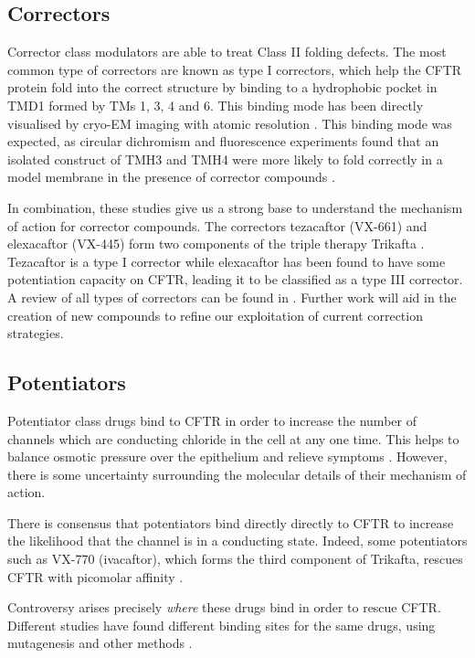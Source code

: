 \subsection{Correctors}
Corrector class modulators are able to treat Class II folding defects. The most common type of correctors are known as type I correctors, which help the CFTR protein fold into the correct structure by binding to a hydrophobic pocket in TMD1 formed by TMs 1, 3, 4 and 6. This binding mode has been directly visualised by cryo-EM imaging with atomic resolution \cite{fiedorczuk2022}. This binding mode was expected, as circular dichromism \cite{greenfield2006} and fluorescence experiments found that an isolated construct of TMH3 and TMH4 were more likely to fold correctly in a model membrane in the presence of corrector compounds \cite{krainer2018}. 

In combination, these studies give us a strong base to understand the mechanism of action for corrector compounds. The correctors tezacaftor (VX-661) and elexacaftor (VX-445) form two components of the triple therapy Trikafta \cite{administration2021, trikafta_website}. Tezacaftor is a type I corrector while elexacaftor has been found to have some potentiation capacity on CFTR, leading it to be classified as a type III corrector. A review of all types of correctors can be found in \cite{veit2018}. Further work will aid in the creation of new compounds to refine our exploitation of current correction strategies.

\subsection{Potentiators}
Potentiator class drugs bind to CFTR in order to increase the number of channels which are conducting chloride in the cell at any one time. This helps to balance osmotic pressure over the epithelium and relieve symptoms \cite{fda_kalydeco_2_years_or_older, fda_kalydeco_approval, jih2013,yeh2017}. However, there is some uncertainty surrounding the molecular details of their mechanism of action. 

There is consensus that potentiators bind directly directly to CFTR to increase the likelihood that the channel is in a conducting state. Indeed, some potentiators such as VX-770 (ivacaftor), which forms the third component of Trikafta, rescues CFTR with picomolar affinity \cite{csanady2019}. 

Controversy arises precisely \textit{where} these drugs bind in order to rescue CFTR. Different studies have found different binding sites for the same drugs, using mutagenesis and other methods \cite{yeh2019, liu2019, laselva2021a}.  

